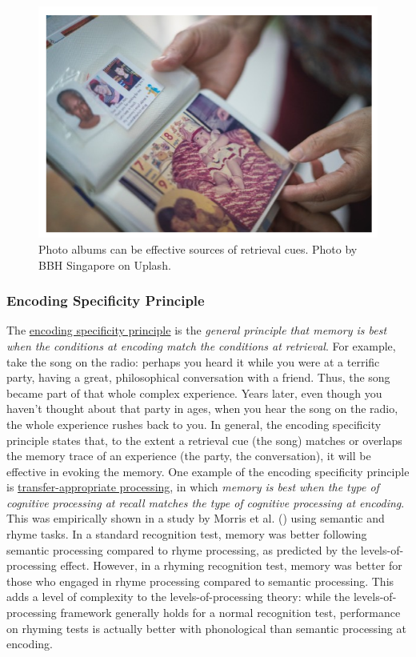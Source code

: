 \documentclass[
]{krantz}
\begin{document}
\begin{figure}

{\centering \includegraphics[width=0.6\linewidth]{images/ch5/fig5} 

}

\caption{Photo albums can be effective sources of retrieval cues. Photo by BBH Singapore on Uplash.}\label{fig:albumbs}
\end{figure}

\subsubsection*{Encoding Specificity Principle}\label{encoding-specificity-principle}


The \hyperref[encoding-specificity-principle]{encoding specificity principle} is the \emph{general principle that memory is best when the conditions at encoding match the conditions at retrieval}. For example, take the song on the radio: perhaps you heard it while you were at a terrific party, having a great, philosophical conversation with a friend. Thus, the song became part of that whole complex experience. Years later, even though you haven't thought about that party in ages, when you hear the song on the radio, the whole experience rushes back to you. In general, the encoding specificity principle states that, to the extent a retrieval cue (the song) matches or overlaps the memory trace of an experience (the party, the conversation), it will be effective in evoking the memory. One example of the encoding specificity principle is \hyperref[transfer-appropriate-processing]{transfer-appropriate processing}, in which \emph{memory is best when the type of cognitive processing at recall matches the type of cognitive processing at encoding}. This was empirically shown in a study by Morris et al. () using semantic and rhyme tasks. In a standard recognition test, memory was better following semantic processing compared to rhyme processing, as predicted by the levels-of-processing effect. However, in a rhyming recognition test, memory was better for those who engaged in rhyme processing compared to semantic processing. This adds a level of complexity to the levels-of-processing theory: while the levels-of-processing framework generally holds for a normal recognition test, performance on rhyming tests is actually better with phonological than semantic processing at encoding.
\end{document}
